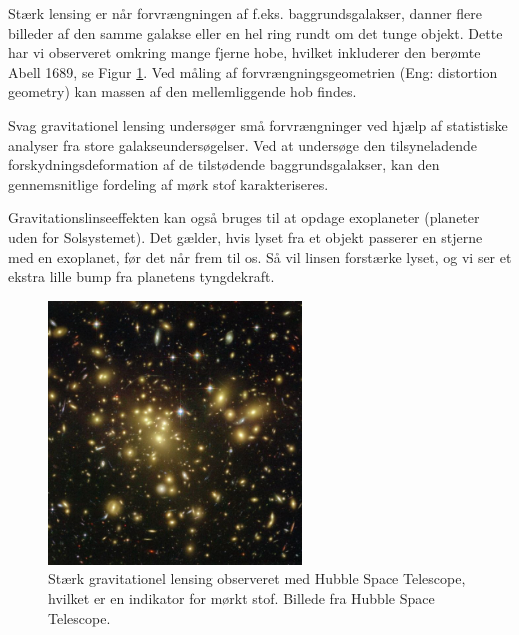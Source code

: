 Stærk lensing er når forvrængningen af f.eks. baggrundsgalakser, danner flere billeder af den samme galakse eller en hel ring rundt om det tunge objekt. Dette har vi observeret omkring mange fjerne hobe, hvilket inkluderer den berømte Abell 1689, se Figur \ref{abell1689}. Ved måling af forvrængningsgeometrien (Eng: distortion geometry) kan massen af den mellemliggende hob findes. %

Svag gravitationel lensing undersøger små forvrængninger ved hjælp af statistiske analyser fra store galakseundersøgelser. Ved at undersøge den tilsyneladende forskydningsdeformation af de tilstødende baggrundsgalakser, kan den gennemsnitlige fordeling af mørk stof karakteriseres.

Gravitationslinseeffekten kan også bruges til at opdage exoplaneter (planeter uden for Solsystemet). Det gælder, hvis lyset fra et objekt passerer en stjerne med en exoplanet, før det når frem til os. Så vil linsen forstærke lyset, og vi ser et ekstra lille bump fra planetens tyngdekraft.

\begin{figure}[h!]
	\centering
	\includegraphics[width=0.6\textwidth]{Astrofysik/Astrofig/abell1689.jpg}
	\caption{Stærk gravitationel lensing observeret med Hubble Space Telescope, hvilket er en indikator for mørkt stof. Billede fra Hubble Space Telescope.}
	\label{abell1689}
\end{figure}

